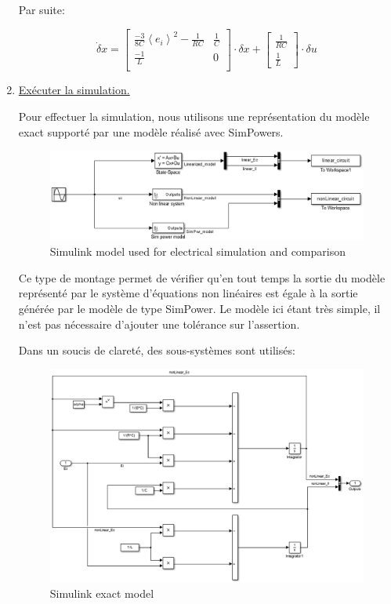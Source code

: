 \documentclass[a4paper,12pt,fleqn]{article}
\def\mean#1{\left< #1 \right>}
\newcommand{\Vi}{e_i}
\begin{document}
\begin{enumerate}
Par suite:

\begin{equation}\label{eq:LinearStateMatrix}
\boxed{
\dot{\delta}{x} =
\begin{bmatrix}
\frac{-3}{8C}{\mean{\Vi}}^2-\frac{1}{RC}&
\frac{1}{C}\\
\frac{-1}{L}&
0\\
\end{bmatrix}
\cdot\delta{x}
+
\begin{bmatrix}
\frac{1}{RC}\\
\frac{1}{L}
\end{bmatrix}
\cdot\delta{u}
}%
\end{equation}

\newpage
\item \underline{Exécuter la simulation.}

Pour effectuer la simulation, nous utilisons une représentation du modèle exact supporté par une modèle réalisé avec SimPowers.

\begin{figure}
  \centering      
    \includegraphics[width=1\textwidth]{Ex1_Simulink.eps}
	\caption{Simulink model used for electrical simulation and comparison}
\end{figure}

Ce type de montage permet de vérifier qu'en tout temps la sortie du modèle représenté par le système d'équations non linéaires est égale à la sortie générée par le modèle de type SimPower.
Le modèle ici étant très simple, il n'est pas nécessaire d'ajouter une tolérance sur l'assertion.

\newpage
Dans un soucis de clareté, des sous-systèmes sont utilisés:

\begin{figure}
  \centering      
    \includegraphics[width=1\textwidth]{Ex1_ExactModel.eps}
	\caption{Simulink exact model}
\end{figure}


\end{enumerate}
\end{document}
